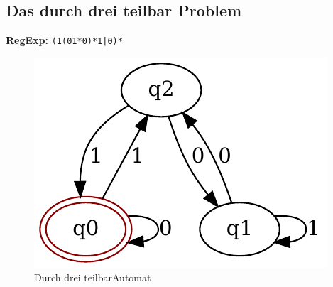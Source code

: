 \clearpage

\subsection{Das durch drei teilbar Problem}
\textbf{RegExp:} \lstinline$(1(01*0)*1|0)*$
\begin{figure}[H]
  \centering
  \includegraphics{images/div3_automat.pdf}
  \caption[\flqq Durch drei teilbar\frqq Automat]{\flqq Durch drei teilbar\frqq Automat}
  \label{fig:div3_automat}
\end{figure}

\clearpage 

